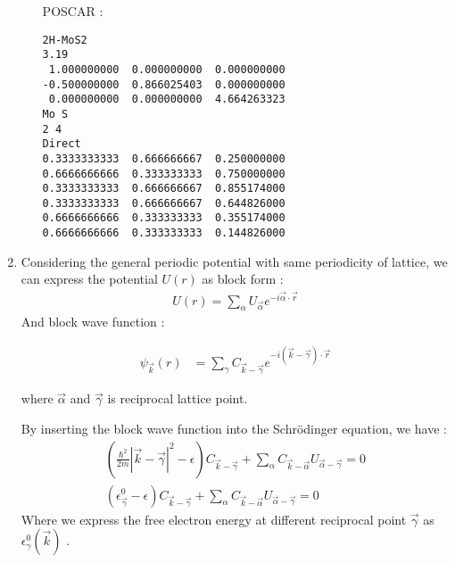 \documentclass[notitlepage]{revtex4-1}
\begin{document}
\begin{CJK}{UTF8}{bsmi}
\begin{enumerate}
\begin{enumerate}[label=(\alph*)]
			POSCAR :
\begin{lstlisting}
2H-MoS2
3.19
 1.000000000  0.000000000  0.000000000
-0.500000000  0.866025403  0.000000000
 0.000000000  0.000000000  4.664263323
Mo S
2 4
Direct
0.3333333333  0.666666667  0.250000000
0.6666666666  0.333333333  0.750000000
0.3333333333  0.666666667  0.855174000
0.3333333333  0.666666667  0.644826000
0.6666666666  0.333333333  0.355174000
0.6666666666  0.333333333  0.144826000
\end{lstlisting}			
		\end{enumerate}
	
	\item Considering the general periodic potential with same periodicity of lattice, we can express the potential $U(r)$ as block form :
	\begin{align*}
		U(r) = \sum_{\alpha} U_{\vec{\alpha}} e^{-i\vec{\alpha} \cdot \vec{r}} 
	\end{align*} 
	And block wave function :
	
	\begin{align*}
	\psi_{\vec{k}}(r) &= \sum_{\gamma}C_{\vec{k}-\vec{\gamma}} e^{-i(\vec{k}-\vec{\gamma}) \cdot \vec{r}}
	\end{align*}
	
	where $\vec{\alpha}$ and $\vec{\gamma}$ is reciprocal lattice point. 

	By inserting the block wave function into the Schrödinger equation, we have :
	\begin{align*}
		\left( \frac{\hbar^2}{2m} |\vec{k} - \vec{\gamma}|^2 - 	\epsilon \right) C_{\vec{k} - \vec{\gamma}} + \sum_{\alpha} C_{\vec{k}-\vec{\alpha}} U_{\vec{\alpha}-\vec{\gamma}} = 0 \\
		\left( \epsilon^{0}_{\vec{\gamma}} - 	\epsilon \right) C_{\vec{k} - \vec{\gamma}} + \sum_{\alpha} C_{\vec{k}-\vec{\alpha}} U_{\vec{\alpha}-\vec{\gamma}} = 0
	\end{align*} 
	Where we express the free electron energy at different reciprocal point $\vec{\gamma}$ as $\epsilon^{0}_{\gamma}(\vec{k})$ . 
	

\end{enumerate}
\end{CJK}
\end{document}
